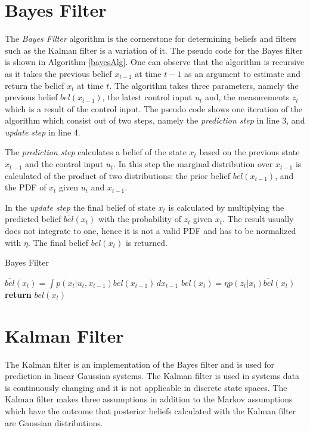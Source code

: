 \documentclass[12pt,oneside,openany,a4paper, %
afrikaans,english,
]{memoir}
\numberwithin{equation}{chapter}
\begin{document}
\section{Bayes Filter}
The \textit{Bayes Filter} algorithm is the cornerstone for determining beliefs and filters such as the Kalman filter is a variation of it. The pseudo code for the Bayes filter is shown in Algorithm \ref{bayesAlg}. One can observe that the algorithm is recursive as it takes the previous belief $x_{t-1}$ at time $t-1$ as an argument to estimate and return the belief $x_t$ at time $t$. The algorithm takes three parameters, namely the previous belief $bel(x_{t-1})$, the latest control input $u_t$ and, the measurements $z_t$ which is a result of the control input. The pseudo code shows one iteration of the algorithm which consist out of two steps, namely the \textit{prediction step} in line 3, and \textit{update step} in line 4.

The \textit{prediction step} calculates a belief of the state $x_t$ based on the previous state $x_{t-1}$ and the control input $u_t$. In this step the marginal distribution over $x_{t-1}$ is calculated of the product of two distributions: the prior belief $bel(x_{t-1})$, and the PDF of $x_t$ given $u_t$ and $x_{t-1}$.

In the \textit{update step} the final belief of state $x_t$ is calculated by multiplying the predicted belief $\overline{bel}(x_t)$ with the probability of $z_t$ given $x_t$. The result usually does not integrate to one, hence it is not a valid PDF and has to be normalized with $\eta$. The final belief $bel(x_t)$ is returned.
\begin{algorithm}
\caption{Bayes Filter}\label{bayesAlg}
\begin{algorithmic}[1]
\State $\overline{bel}(x_t) = \int p(x_t|u_t, x_{t-1})bel(x_{t-1})\, dx_{t-1}$
\State $bel(x_t) = \eta p(z_t|x_t) \overline{bel} (x_t)$
\EndFor
\State \textbf{return} $bel(x_t)$
\EndProcedure
\end{algorithmic}
\end{algorithm}

\section{Kalman Filter}
The Kalman filter is an implementation of the Bayes filter and is used for prediction in linear Gaussian systems. The Kalman filter is used in systems data is continuously changing and it is not applicable in discrete state spaces. The Kalman filter makes three assumptions in addition to the Markov assumptions which have the outcome that posterior beliefs calculated with the Kalman filter are Gaussian distributions.
\end{document}
